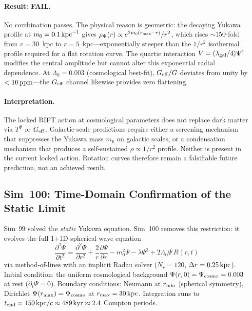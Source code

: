 \documentclass[12pt,a4paper]{article}
\begin{document}
\paragraph{Result: FAIL.}
No combination passes.  The physical reason is geometric: the decaying
Yukawa profile at $m_0 = 0.1\,{\rm kpc}^{-1}$ gives
$\rho_\Psi(r) \propto e^{2m_0(r_{\rm max}-r)}/r^2$, which rises
$\sim 150$-fold from $r=30$~kpc to $r=5$~kpc---exponentially steeper
than the $1/r^2$ isothermal profile required for a flat rotation curve.
The quartic interaction $V = (\lambda_{\rm gal}/4)\Psi^4$ modifies the
central amplitude but cannot alter this exponential radial dependence.
At $\Lambda_0 = 0.003$ (cosmological best-fit), $G_{\rm eff}/G$ deviates
from unity by $< 10\,{\rm ppm}$---the $G_{\rm eff}$ channel likewise
provides zero flattening.

\paragraph{Interpretation.}
The locked RIFT action at cosmological parameters does not replace dark
matter via $T^\Psi$ or $G_{\rm eff}$.  Galactic-scale predictions require
either a screening mechanism that suppresses the Yukawa mass $m_0$ on
galactic scales, or a condensation mechanism that produces a self-sustained
$\rho \propto 1/r^2$ profile.  Neither is present in the current locked
action.  Rotation curves therefore remain a falsifiable future prediction,
not an achieved result.

\subsection{Sim~100: Time-Domain Confirmation of the Static Limit}
\label{sec:sim100}

Sim~99 solved the \emph{static} Yukawa equation.  Sim~100 removes this
restriction: it evolves the full 1+1D spherical wave equation
\begin{equation}
\frac{\partial^2\Psi}{\partial t^2}
  = \frac{\partial^2\Psi}{\partial r^2}
  + \frac{2}{r}\frac{\partial\Psi}{\partial r}
  - m_0^2\Psi - \lambda\Psi^3
  + 2\Lambda_0\Psi\, R(r,t)
\label{eq:psi_timedomain}
\end{equation}
via method-of-lines with an implicit Radau solver ($N_r=120$, $\Delta
r=0.25\,{\rm kpc}$).  Initial condition: the uniform cosmological
background $\Psi(r,0)=\Psi_{\rm cosmo}=0.003$ at rest
($\partial_t\Psi=0$). Boundary conditions: Neumann at $r_{\rm min}$
(spherical symmetry), Dirichlet $\Psi(r_{\rm max})=\Psi_{\rm cosmo}$ at
$r_{\rm max}=30\,{\rm kpc}$.  Integration runs to $t_{\rm end}=150\,{\rm
kpc}/c \approx 489\,{\rm kyr} \approx 2.4$ Compton periods.
\end{document}
